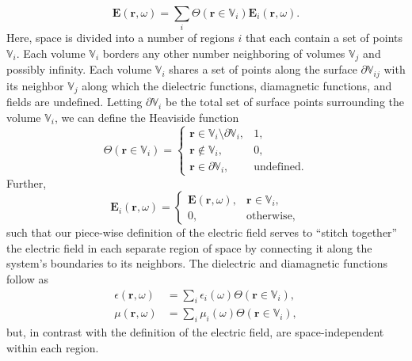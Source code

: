 \documentclass{article}
\begin{document}
\begin{equation}
\mathbf{E}(\mathbf{r},\omega) = \sum_i\Theta(\mathbf{r}\in\mathbb{V}_i)\mathbf{E}_i(\mathbf{r},\omega).
\end{equation}
Here, space is divided into a number of regions $i$ that each contain a set of points $\mathbb{V}_i$. Each volume $\mathbb{V}_i$ borders any other number neighboring of volumes $\mathbb{V}_j$ and possibly infinity. Each volume $\mathbb{V}_i$ shares a set of points along the surface $\partial\mathbb{V}_{ij}$ with its neighbor $\mathbb{V}_j$ along which the dielectric functions, diamagnetic functions, and fields are undefined. Letting $\partial\mathbb{V}_i$ be the total set of surface points surrounding the volume $\mathbb{V}_i$, we can define the Heaviside function
\begin{equation}
\Theta(\mathbf{r}\in\mathbb{V}_i) = 
\begin{cases}
\mathbf{r}\in\mathbb{V}_i\setminus\partial\mathbb{V}_i, & 1,\\
\mathbf{r}\notin\mathbb{V}_i, & 0,\\
\mathbf{r}\in\partial\mathbb{V}_i, & \mathrm{undefined}.
\end{cases}
\end{equation}
Further, 
\begin{equation}
\mathbf{E}_i(\mathbf{r},\omega) = 
\begin{cases}
\mathbf{E}(\mathbf{r},\omega), & \mathbf{r}\in\mathbb{V}_i,\\
0, & \mathrm{otherwise},
\end{cases}
\end{equation}
such that our piece-wise definition of the electric field serves to ``stitch together'' the electric field in each separate region of space by connecting it along the system's boundaries to its neighbors. The dielectric and diamagnetic functions follow as
\begin{equation}
\begin{split}
\epsilon(\mathbf{r},\omega) &= \sum_i\epsilon_i(\omega)\Theta(\mathbf{r}\in\mathbb{V}_i),\\
\mu(\mathbf{r},\omega) &= \sum_i\mu_i(\omega)\Theta(\mathbf{r}\in\mathbb{V}_i),
\end{split}
\end{equation}
but, in contrast with the definition of the electric field, are space-independent within each region.
\end{document}
